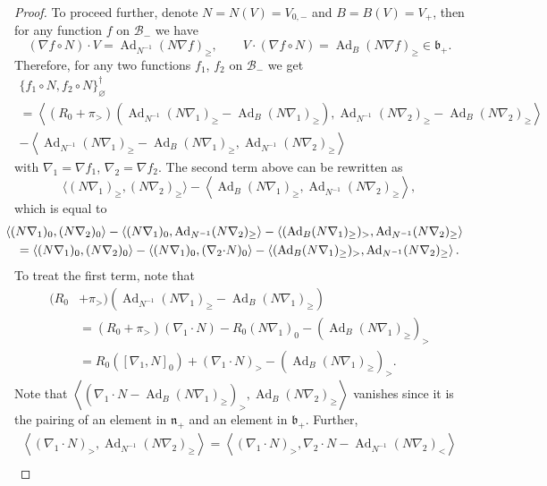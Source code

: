 \documentclass{amsart}
\theoremstyle{definition}
\theoremstyle{remark}
\numberwithin{equation}{section}
\numberwithin{theorem}{section}
\def\B{{\mathcal B}}
\def\b{\mathfrak b}
\def\n{\mathfrak n}
\def\Ad{\operatorname{Ad}}
\begin{document}
\begin{proof}
To proceed further, denote $N=N(V)=V_{0,-}$ and $B=B(V)=V_+$, then for any function $f$ on $\B_-$ we have
\[
(\nabla f\circ N){\cdot} V=\Ad_{N^{-1}}(N\nabla f)_\ge,\qquad
V{\cdot}(\nabla f\circ N)=\Ad_B(N\nabla f)_\ge\in\b_+.
\]
Therefore, for any two functions $f_1$, $f_2$ on $\B_-$ we get
\begin{multline}\label{interimbra}
\{f_1\circ N,f_2\circ N\}_\varnothing^\dag\\=
\left\langle(R_0+\pi_>)\left(\Ad_{N^{-1}}(N\nabla_1)_\ge-\Ad_B(N\nabla_1)_\ge\right),
\Ad_{N^{-1}}(N\nabla_2)_\ge-\Ad_B(N\nabla_2)_\ge\right\rangle\\
-\left\langle\Ad_{N^{-1}}(N\nabla_1)_\ge-\Ad_B(N\nabla_1)_\ge,\Ad_{N^{-1}}(N\nabla_2)_\ge\right\rangle
\end{multline}
with $\nabla_1=\nabla f_1$, $\nabla_2=\nabla f_2$. The second term above can be rewritten as
\[
\langle (N\nabla_1)_\ge,(N\nabla_2)_\ge\rangle-\left\langle\Ad_B(N\nabla_1)_\ge,
\Ad_{N^{-1}}(N\nabla_2)_\ge\right\rangle,
\]
which is equal to
\begin{multline*}
\hskip-8pt\langle (N\nabla_1)_0,(N\nabla_2)_0\rangle-\left\langle(N\nabla_1)_0,\Ad_{N^{-1}}(N\nabla_2)_\ge\right\rangle
-\left\langle(\Ad_B(N\nabla_1)_\ge)_>,\Ad_{N^{-1}}(N\nabla_2)_\ge\right\rangle\\
=\langle (N\nabla_1)_0,(N\nabla_2)_0\rangle-\langle (N\nabla_1)_0,(\nabla_2{\cdot} N)_0\rangle
-\left\langle(\Ad_B(N\nabla_1)_\ge)_>,\Ad_{N^{-1}}(N\nabla_2)_\ge\right\rangle.
\end{multline*}
To treat the first term, note that
\begin{align*}
(R_0&+\pi_>)\left(\Ad_{N^{-1}}(N\nabla_1)_\ge-\Ad_B(N\nabla_1)_\ge\right)\\
&=(R_0+\pi_>)(\nabla_1{\cdot} N)-R_0(N\nabla_1)_0-(\Ad_B(N\nabla_1)_\ge)_>\\
&=R_0([\nabla_1,N]_0)+(\nabla_1{\cdot} N)_>-(\Ad_B(N\nabla_1)_\ge)_>.
\end{align*}
Note that $\left\langle \left(\nabla_1{\cdot} N-\Ad_B(N\nabla_1)_\ge\right)_>,\Ad_B(N\nabla_2)_\ge\right\rangle$ vanishes
since it is the pairing of an element in $\n_+$ and an element in $\b_+$. Further, 
\begin{multline*}
\left\langle (\nabla_1{\cdot} N)_>,\Ad_{N^{-1}}(N\nabla_2)_\ge\right\rangle=
\left\langle (\nabla_1{\cdot} N)_>,\nabla_2{\cdot} N -\Ad_{N^{-1}}(N\nabla_2)_<\right\rangle\\

\end{multline*}
\end{proof}
\end{document}
